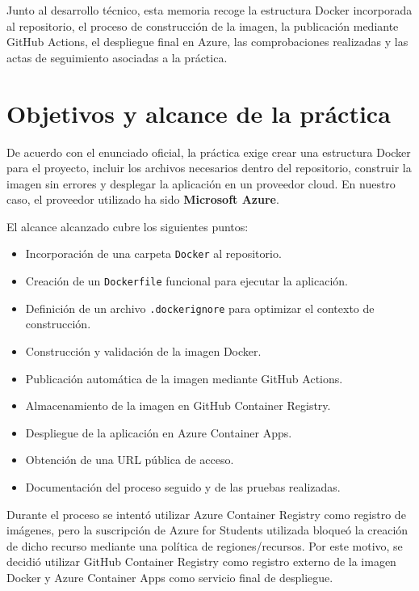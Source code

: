 \documentclass[11pt,a4paper]{article}
\begin{document}
Junto al desarrollo t\'ecnico, esta memoria recoge la estructura Docker incorporada al repositorio, el proceso de construcci\'on de la imagen, la publicaci\'on mediante GitHub Actions, el despliegue final en Azure, las comprobaciones realizadas y las actas de seguimiento asociadas a la pr\'actica.

\section{Objetivos y alcance de la pr\'actica}

De acuerdo con el enunciado oficial, la pr\'actica exige crear una estructura Docker para el proyecto, incluir los archivos necesarios dentro del repositorio, construir la imagen sin errores y desplegar la aplicaci\'on en un proveedor cloud. En nuestro caso, el proveedor utilizado ha sido \textbf{Microsoft Azure}.

El alcance alcanzado cubre los siguientes puntos:

\begin{itemize}
  \item Incorporaci\'on de una carpeta \texttt{Docker} al repositorio.
  \item Creaci\'on de un \texttt{Dockerfile} funcional para ejecutar la aplicaci\'on.
  \item Definici\'on de un archivo \texttt{.dockerignore} para optimizar el contexto de construcci\'on.
  \item Construcci\'on y validaci\'on de la imagen Docker.
  \item Publicaci\'on autom\'atica de la imagen mediante GitHub Actions.
  \item Almacenamiento de la imagen en GitHub Container Registry.
  \item Despliegue de la aplicaci\'on en Azure Container Apps.
  \item Obtenci\'on de una URL p\'ublica de acceso.
  \item Documentaci\'on del proceso seguido y de las pruebas realizadas.
\end{itemize}

Durante el proceso se intent\'o utilizar Azure Container Registry como registro de im\'agenes, pero la suscripci\'on de Azure for Students utilizada bloque\'o la creaci\'on de dicho recurso mediante una pol\'itica de regiones/recursos. Por este motivo, se decidi\'o utilizar GitHub Container Registry como registro externo de la imagen Docker y Azure Container Apps como servicio final de despliegue.
\end{document}
